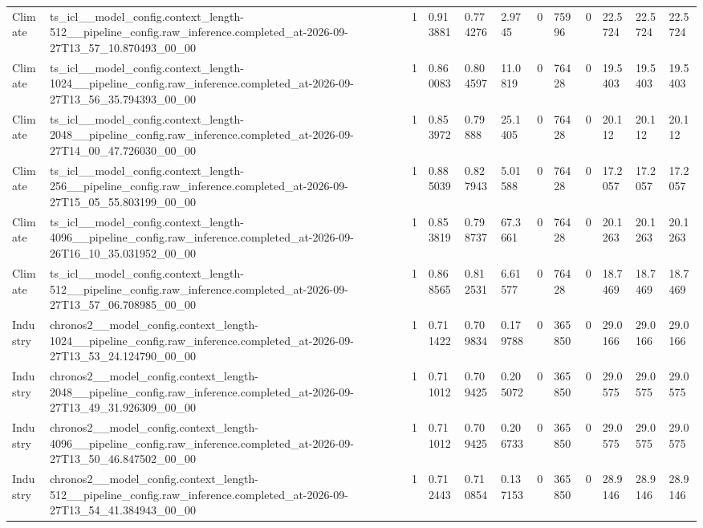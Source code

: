 \begin{tabular}{llllllllllll}
Climate & ts\_icl\_\_model\_config.context\_length-512\_\_pipeline\_config.raw\_inference.completed\_at-2026-09-27T13\_57\_10.870493\_00\_00 & 1 & 0.913881 & 0.774276 & 2.9745 & 0 & 75996 & 0 & 22.5724 & 22.5724 & 22.5724 \\
Climate & ts\_icl\_\_model\_config.context\_length-1024\_\_pipeline\_config.raw\_inference.completed\_at-2026-09-27T13\_56\_35.794393\_00\_00 & 1 & 0.860083 & 0.804597 & 11.0819 & 0 & 76428 & 0 & 19.5403 & 19.5403 & 19.5403 \\
Climate & ts\_icl\_\_model\_config.context\_length-2048\_\_pipeline\_config.raw\_inference.completed\_at-2026-09-27T14\_00\_47.726030\_00\_00 & 1 & 0.853972 & 0.79888 & 25.1405 & 0 & 76428 & 0 & 20.112 & 20.112 & 20.112 \\
Climate & ts\_icl\_\_model\_config.context\_length-256\_\_pipeline\_config.raw\_inference.completed\_at-2026-09-27T15\_05\_55.803199\_00\_00 & 1 & 0.885039 & 0.827943 & 5.01588 & 0 & 76428 & 0 & 17.2057 & 17.2057 & 17.2057 \\
Climate & ts\_icl\_\_model\_config.context\_length-4096\_\_pipeline\_config.raw\_inference.completed\_at-2026-09-26T16\_10\_35.031952\_00\_00 & 1 & 0.853819 & 0.798737 & 67.3661 & 0 & 76428 & 0 & 20.1263 & 20.1263 & 20.1263 \\
Climate & ts\_icl\_\_model\_config.context\_length-512\_\_pipeline\_config.raw\_inference.completed\_at-2026-09-27T13\_57\_06.708985\_00\_00 & 1 & 0.868565 & 0.812531 & 6.61577 & 0 & 76428 & 0 & 18.7469 & 18.7469 & 18.7469 \\
Industry & chronos2\_\_model\_config.context\_length-1024\_\_pipeline\_config.raw\_inference.completed\_at-2026-09-27T13\_53\_24.124790\_00\_00 & 1 & 0.711422 & 0.709834 & 0.179788 & 0 & 365850 & 0 & 29.0166 & 29.0166 & 29.0166 \\
Industry & chronos2\_\_model\_config.context\_length-2048\_\_pipeline\_config.raw\_inference.completed\_at-2026-09-27T13\_49\_31.926309\_00\_00 & 1 & 0.711012 & 0.709425 & 0.205072 & 0 & 365850 & 0 & 29.0575 & 29.0575 & 29.0575 \\
Industry & chronos2\_\_model\_config.context\_length-4096\_\_pipeline\_config.raw\_inference.completed\_at-2026-09-27T13\_50\_46.847502\_00\_00 & 1 & 0.711012 & 0.709425 & 0.206733 & 0 & 365850 & 0 & 29.0575 & 29.0575 & 29.0575 \\
Industry & chronos2\_\_model\_config.context\_length-512\_\_pipeline\_config.raw\_inference.completed\_at-2026-09-27T13\_54\_41.384943\_00\_00 & 1 & 0.712443 & 0.710854 & 0.137153 & 0 & 365850 & 0 & 28.9146 & 28.9146 & 28.9146 \\

\end{tabular}
